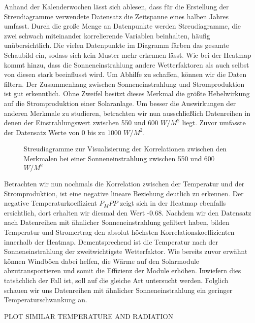 \documentclass[12pt, a4paper]{article}
\begin{document}
Anhand der Kalenderwochen lässt sich ablesen, dass für die Erstellung der Streudiagramme verwendete Datensatz die Zeitspanne eines halben Jahres umfasst. Durch die große Menge an Datenpunkte werden Streudiagramme, die zwei schwach miteinander korrelierende Variablen beinhalten, häufig unübersichtlich. Die vielen Datenpunkte im Diagramm färben das gesamte Schaubild ein, sodass sich kein Muster mehr erkennen lässt. Wie bei der Heatmap kommt hinzu, dass die Sonneneinstrahlung andere Wetterfaktoren als auch selbst von diesen stark beeinflusst wird. Um Abhilfe zu schaffen, können wir die Daten filtern. Der Zusammenhang zwischen Sonneneinstrahlung und Stromproduktion ist gut erkenntlich. Ohne Zweifel besitzt dieses Merkmal die größte Hebelwirkung auf die Stromproduktion einer Solaranlage. Um besser die Auswirkungen der anderen Merkmale zu studieren, betrachten wir nun ausschließlich Datenreihen in denen der Einstrahlungswert zwischen 550 und 600 $W/ M^2$ liegt. Zuvor umfasste der Datensatz Werte von 0 bis zu 1000 $W/ M^2$.

\begin{figure}
\centering
\def\svgwidth{450pt}

\caption{Streudiagramme zur Visualisierung der Korrelationen zwischen den Merkmalen bei einer Sonneneinstrahlung zwischen 550 und 600 $W/ M^2$}
\label{fig:pairplot_filtered}
\end {figure}

Betrachten wir nun nochmals die Korrelation zwischen der Temperatur und der Stromproduktion, ist eine negative lineare Beziehung deutlich zu erkennen. Der negative Temperaturkoeffizient $P_MPP$ zeigt sich in der Heatmap ebenfalls ersichtlich, dort erhalten wir diesmal den Wert -0.68. Nachdem wir den Datensatz nach Datenreihen mit ähnlicher Sonneneinstrahlung gefiltert haben, bilden Temperatur und Stromertrag den absolut höchsten Korrelationskoeffizienten innerhalb der Heatmap. Dementsprechend ist die Temperatur nach der Sonneneinstrahlung der zweitwichtigste Wetterfaktor. Wie bereits zuvor erwähnt können Windböen dabei helfen, die Wärme auf den Solarmodule abzutransportieren und somit die Effizienz der Module erhöhen. Inwiefern dies tatsächlich der Fall ist, soll auf die gleiche Art untersucht werden. Folglich schauen wir uns Datenreihen mit ähnlicher Sonneneinstrahlung ein geringer Temperaturschwankung an.

PLOT SIMILAR TEMPERATURE AND RADIATION

  

\newpage
\end{document}
